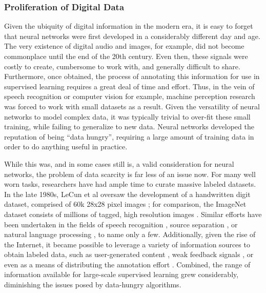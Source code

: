 \subsubsection{Proliferation of Digital Data}
\label{subsec:perceptrons}

Given the ubiquity of digital information in the modern era, it is easy to forget that neural networks were first developed in a considerably different day and age.
The very existence of digital audio and images, for example, did not become commonplace until the end of the 20th century.
Even then, these signals were costly to create, cumbersome to work with, and generally difficult to share.
Furthermore, once obtained, the process of annotating this information for use in supervised learning requires a great deal of time and effort.
Thus, in the vein of speech recognition or computer vision for example, machine perception research was forced to work with small datasets as a result.
Given the versatility of neural networks to model complex data, it was typically trivial to over-fit these small training, while failing to generalize to new data.
Neural networks developed the reputation of being ``data hungry'', requiring a large amount of training data in order to do anything useful in practice.

While this was, and in some cases still is, a valid consideration for neural networks, the problem of data scarcity is far less of an issue now.
For many well worn tasks, researchers have had ample time to curate massive labeled datasets.
In the late 1980s, LeCun et al oversaw the development of a handwritten digit dataset, comprised of 60k 28x28 pixel images \cite{};
for comparison, the ImageNet dataset consists of millions of tagged, high resolution images \cite{}.
Similar efforts have been undertaken in the fields of speech recognition \cite{TIMIT}, source separation \cite{charm, MedleyDB}, or natural language processing \cite{WallStreet, Wikipedia}, to name only a few.
Additionally, given the rise of the Internet, it became possible to leverage a variety of information sources to obtain labeled data, such as user-generated content \cite{last.fm}, weak feedback signals \cite{netflix}, or even as a means of distributing the annotation effort \cite{Captcha, CitizenScience}.
Combined, the range of information available for large-scale supervised learning grew considerably, diminishing the issues posed by data-hungry algorithms.

